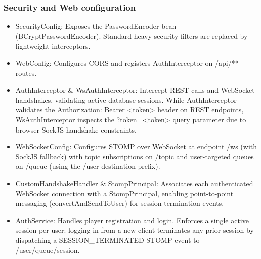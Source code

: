 \documentclass[12pt,a4paper]{article}
\begin{document}
\subsubsection{Security and Web configuration}
\begin{itemize}
    \item SecurityConfig: Exposes the PasswordEncoder bean (BCryptPasswordEncoder). Standard heavy security filters are replaced by lightweight interceptors.
    \item WebConfig: Configures CORS and registers AuthInterceptor on /api/** routes.
    \item AuthInterceptor \& WsAuthInterceptor: Intercept REST calls and WebSocket handshakes, validating active database sessions. While AuthInterceptor validates the Authorization: Bearer <token> header on REST endpoints, WsAuthInterceptor inspects the ?token=<token> query parameter due to browser SockJS handshake constraints.
    \item WebSocketConfig: Configures STOMP over WebSocket at endpoint /ws (with SockJS fallback) with topic subscriptions on /topic and user-targeted queues on /queue (using the /user destination prefix).
    \item CustomHandshakeHandler \& StompPrincipal: Associates each authenticated WebSocket connection with a StompPrincipal, enabling point-to-point messaging (convertAndSendToUser) for session termination events.
    \item AuthService: Handles player registration and login. Enforces a single active session per user: logging in from a new client terminates any prior session by dispatching a SESSION\_\allowbreak TERMINATED STOMP event to /user/queue/session.
\end{itemize}
\end{document}
